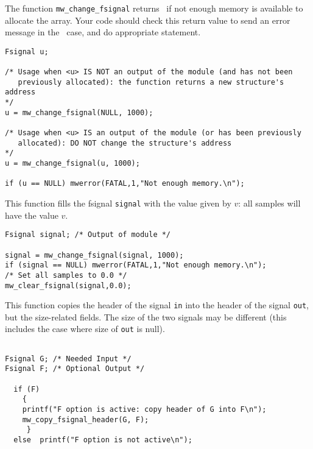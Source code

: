 The function \verb+mw_change_fsignal+ returns \Null\ if not enough memory is available to allocate the array. 
Your code should check this return value to 
send an error message in the \Null\ case, and do appropriate statement.

\Next
\Example
\begin{verbatim}
Fsignal u; 

/* Usage when <u> IS NOT an output of the module (and has not been
   previously allocated): the function returns a new structure's address
*/
u = mw_change_fsignal(NULL, 1000);

/* Usage when <u> IS an output of the module (or has been previously
   allocated): DO NOT change the structure's address
*/
u = mw_change_fsignal(u, 1000);

if (u == NULL) mwerror(FATAL,1,"Not enough memory.\n");

\end{verbatim}

\newpage %

\Description
This function fills the fsignal \verb+signal+ with the value given by $v$:
all samples will have the value $v$. 

\Next
\Example
\begin{verbatim}
Fsignal signal; /* Output of module */

signal = mw_change_fsignal(signal, 1000);
if (signal == NULL) mwerror(FATAL,1,"Not enough memory.\n");
/* Set all samples to 0.0 */
mw_clear_fsignal(signal,0.0);
\end{verbatim}

\newpage %

\Description
This function copies the header of the signal \verb+in+ into the header of the signal \verb+out+, but the size-related fields. The size of the two signals may be different
(this includes the case where size of \verb+out+ is null).

\Next
\Example
\begin{verbatim}

Fsignal G; /* Needed Input */
Fsignal F; /* Optional Output */

  if (F) 
    {
    printf("F option is active: copy header of G into F\n");
    mw_copy_fsignal_header(G, F);
     }
  else  printf("F option is not active\n");
\end{verbatim}

